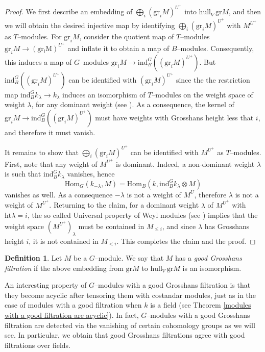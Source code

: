 \documentclass{article}
\theoremstyle{plain}
\theoremstyle{definition}
\newtheorem{Def}[Th]{Definition}
\begin{document}
\begin{proof}
We first describe an embedding of  $\bigoplus_i (\mathrm{gr}_i M)^{U^+}$ into $\mathrm{hull}_\nabla \mathrm{gr}M$, and then we will obtain the desired injective map by identifying $\bigoplus_i (\mathrm{gr}_i M)^{U^+}$ with $M^{U^+}$ as $T$--modules. For $\mathrm{gr}_i M$, consider the quotient map of $T$--modules $\mathrm{gr}_iM \to (\mathrm{gr_iM})^{U^+}$ and inflate it to obtain a map of $B$--modules. Consequently, this induces a map of $G$--modules $\mathrm{gr}_i M\to \mathrm{ind}_B^G((\mathrm{gr}_iM)^{U^+})$. But $\mathrm{ind}_B^G((\mathrm{gr}_iM)^{U^+})$ can be identified with $(\mathrm{gr}_i M)^{U^+}$ since the the restriction map $\mathrm{ind}_B^G k_\lambda \to k_\lambda$ induces an isomorphism of $T$--modules on the weight space of weight $\lambda$, for any dominant weight (see \cite[Proposition 20]{FvdK10}). As a consequence, the kernel of $\mathrm{gr}_i M\to \mathrm{ind}_B^G((\mathrm{gr}_iM)^{U^+})$ must have weights with Grosshans height less that $i$, and therefore it must vanish. 

  It remains to show that $\bigoplus_i (\mathrm{gr}_iM)^{U^+}$ can be identified with $M^{U^+}$ as $T$--modules.  First, note that any weight of $M^{U^+}$ is dominant. Indeed, a non-dominant weight $\lambda$ is such that $\mathrm{ind}_B^G k_\lambda$ vanishes, hence  
  \[
  \mathrm{Hom}_G(k_{-\lambda},M)=\mathrm{Hom}_B(k, \mathrm{ind}_B^G k_\lambda \otimes M)
  \]
  vanishes as well. As a consequence  $-\lambda$ is not a weight of $M^{U}$, therefore $\lambda$ is not a weight of $M^{U^+}$. 
     Returning to the claim, for a dominant weight $\lambda$ of $M^{U^+}$ with $\mathrm{ht} \lambda=i$, the so called Universal property of Weyl modules (see \cite[Proposition 21]{FvdK10}) implies that the weight space $(M^{U^+})_\lambda$ must be contained in $M_{\leq i}$, and since $\lambda$ has Grosshans height $i$, it is not contained in $M_{<i}$. This completes the claim and the proof. 
\end{proof}

\begin{Def}
    Let $M$ be a $G$--module. We say that $M$ has a \textit{good Grosshans filtration} if the above embedding from $\mathrm{gr}M$ to  $\mathrm{hull}_\nabla \mathrm{gr} M$ is an isomorphism. 
\end{Def}

An interesting property of $G$--modules with a good Grosshans filtration is that they become acyclic after tensoring them with costandar modules, just as in the case of modules with a good filtration when $k$ is a field (see Theorem \ref{modules with a good filtration are acyclic}). In fact, $G$--modules with a good Grosshans filtration are detected via the vanishing of certain cohomology groups as we will see. In particular, we obtain that  good Grosshans filtrations agree with good filtrations over fields.  
\end{document}

